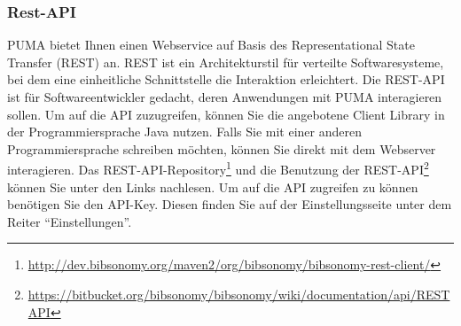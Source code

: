 \documentclass[a4paper,11pt,twoside]{scrbook}
\begin{document}
\subsubsection{Rest-API}
PUMA bietet Ihnen einen Webservice auf Basis des Representational State Transfer (REST) an. REST ist ein Architekturstil für verteilte Softwaresysteme, bei dem eine einheitliche Schnittstelle die Interaktion erleichtert. \newline
Die REST-API ist für Softwareentwickler gedacht, deren Anwendungen mit PUMA interagieren sollen. Um auf die API zuzugreifen, können Sie die angebotene Client Library in der Programmiersprache Java nutzen. Falls Sie mit einer anderen Programmiersprache schreiben möchten, können Sie direkt mit dem Webserver interagieren.\newline
Das REST-API-Repository\footnote{\url{http://dev.bibsonomy.org/maven2/org/bibsonomy/bibsonomy-rest-client/}} und die Benutzung der REST-API\footnote{\url{https://bitbucket.org/bibsonomy/bibsonomy/wiki/documentation/api/REST API}} können Sie unter den Links nachlesen.
\newline
\newline
Um auf die API zugreifen zu können benötigen Sie den API-Key. Diesen finden Sie auf der Einstellungsseite unter dem Reiter \enquote{Einstellungen}. 
\end{document}
